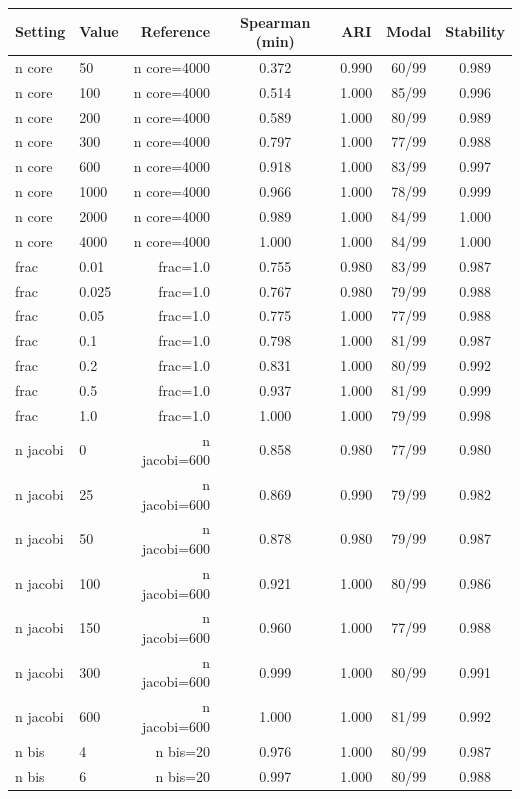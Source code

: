 \begin{tabular*}{\linewidth}{@{\extracolsep{\fill}}llrcccc@{}}
\toprule
Setting & Value & Reference & Spearman (min) & ARI & Modal & Stability\\
\midrule
n core & 50 & n core=4000 & 0.372 & 0.990 & 60/99 & 0.989\\
n core & 100 & n core=4000 & 0.514 & 1.000 & 85/99 & 0.996\\
n core & 200 & n core=4000 & 0.589 & 1.000 & 80/99 & 0.989\\
n core & 300 & n core=4000 & 0.797 & 1.000 & 77/99 & 0.988\\
n core & 600 & n core=4000 & 0.918 & 1.000 & 83/99 & 0.997\\
n core & 1000 & n core=4000 & 0.966 & 1.000 & 78/99 & 0.999\\
n core & 2000 & n core=4000 & 0.989 & 1.000 & 84/99 & 1.000\\
n core & 4000 & n core=4000 & 1.000 & 1.000 & 84/99 & 1.000\\
frac & 0.01 & frac=1.0 & 0.755 & 0.980 & 83/99 & 0.987\\
frac & 0.025 & frac=1.0 & 0.767 & 0.980 & 79/99 & 0.988\\
frac & 0.05 & frac=1.0 & 0.775 & 1.000 & 77/99 & 0.988\\
frac & 0.1 & frac=1.0 & 0.798 & 1.000 & 81/99 & 0.987\\
frac & 0.2 & frac=1.0 & 0.831 & 1.000 & 80/99 & 0.992\\
frac & 0.5 & frac=1.0 & 0.937 & 1.000 & 81/99 & 0.999\\
frac & 1.0 & frac=1.0 & 1.000 & 1.000 & 79/99 & 0.998\\
n jacobi & 0 & n jacobi=600 & 0.858 & 0.980 & 77/99 & 0.980\\
n jacobi & 25 & n jacobi=600 & 0.869 & 0.990 & 79/99 & 0.982\\
n jacobi & 50 & n jacobi=600 & 0.878 & 0.980 & 79/99 & 0.987\\
n jacobi & 100 & n jacobi=600 & 0.921 & 1.000 & 80/99 & 0.986\\
n jacobi & 150 & n jacobi=600 & 0.960 & 1.000 & 77/99 & 0.988\\
n jacobi & 300 & n jacobi=600 & 0.999 & 1.000 & 80/99 & 0.991\\
n jacobi & 600 & n jacobi=600 & 1.000 & 1.000 & 81/99 & 0.992\\
n bis & 4 & n bis=20 & 0.976 & 1.000 & 80/99 & 0.987\\
n bis & 6 & n bis=20 & 0.997 & 1.000 & 80/99 & 0.988\\

\end{tabular*}
